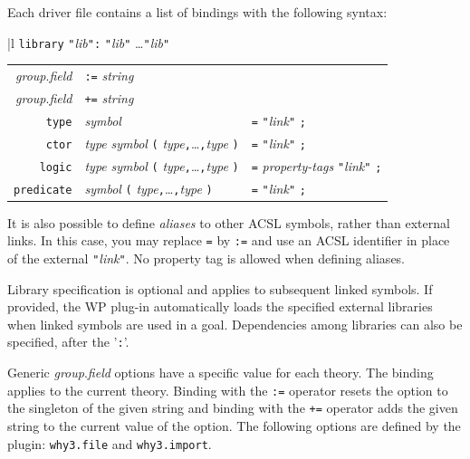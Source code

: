 \newcommand{\ccc}{\texttt{,}\ldots\texttt{,}}
\newcommand{\user}[1]{\texttt{"}\textit{#1}\texttt{"}}
Each driver file contains a list of bindings with the following syntax:
\begin{center}
  \begin{tabular}{|l}
  \texttt{library} \user{lib}\verb':' \user{lib} \ldots \user{lib} \\
  \quad\begin{tabular}{rll}
  \rule{0em}{1.2em}
  \textit{group}.\textit{field} &\texttt{:=} \textit{string} \\
  \textit{group}.\textit{field} &\texttt{+=} \textit{string} \\
  \texttt{type} & \textit{symbol} & \verb'=' \user{link} \verb';' \\
  \texttt{ctor} & \textit{type} \textit{symbol}
                   \verb'(' \textit{type}\ccc\textit{type} \verb')'
                 & \verb'=' \user{link} \verb';' \\
  \texttt{logic} & \textit{type} \textit{symbol}
                   \verb'(' \textit{type}\ccc\textit{type} \verb')'
                 & \verb'=' \textit{property-tags} \user{link} \verb';' \\
  \texttt{predicate} & \textit{symbol}
                   \verb'(' \textit{type}\ccc\textit{type} \verb')'
                 & \verb'=' \user{link} \verb';'
  \end{tabular}
  \end{tabular}
\end{center}

It is also possible to define \emph{aliases} to other ACSL symbols, rather
than external links. In this case, you may replace \verb+=+ by
\verb+:=+ and use an ACSL identifier in place of the external \user{link}.
No property tag is allowed when defining aliases.

Library specification is optional and applies to subsequent linked
symbols. If provided, the \textsf{WP} plug-in automatically loads the
specified external libraries when linked symbols are used in a
goal. Dependencies among libraries can also be specified, after the
'\verb':''.

Generic \textit{group}.\textit{field} options have a specific
value for each theory. The binding applies to the current theory.
Binding with the \verb':=' operator
resets the option to the singleton of the given string
and binding with the \verb'+=' operator
adds the given string to the current value of the option.
The following options are defined by the plugin:
\texttt{why3.file} and \texttt{why3.import}.

